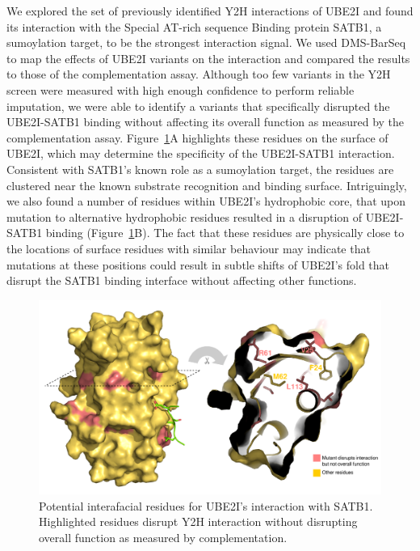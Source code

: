 We explored the set of previously identified Y2H interactions of UBE2I and found its interaction with the Special AT-rich sequence Binding protein SATB1, a sumoylation target, to be the strongest interaction signal. We used DMS-BarSeq to map the effects of UBE2I variants on the interaction and compared the results to those of the complementation assay. Although too few variants in the Y2H screen were measured with high enough confidence to perform reliable imputation, we were able to identify a  variants that specifically disrupted the UBE2I-SATB1 binding without affecting its overall function as measured by the complementation assay. Figure~\ref{fig:y2hVScompl}A highlights these residues on the surface of UBE2I, which may determine the specificity of the UBE2I-SATB1 interaction. Consistent with SATB1's known role as a sumoylation target, the residues are clustered near the known substrate recognition and binding surface. Intriguingly, we also found a number of residues within UBE2I's hydrophobic core, that upon mutation to alternative hydrophobic residues resulted in a disruption of UBE2I-SATB1 binding (Figure~\ref{fig:y2hVScompl}B). The fact that these residues are physically close to the locations of surface residues with similar behaviour may indicate that mutations at these positions could result in subtle shifts of UBE2I's fold that disrupt the SATB1 binding interface without affecting other functions.

\begin{figure}[h!]
	\centering
	\includegraphics[width=\textwidth]{img/satb1_interface.pdf}
	\caption{Potential interafacial residues for UBE2I's interaction with SATB1. Highlighted residues disrupt Y2H interaction without disrupting overall function as measured by complementation.}
	\label{fig:y2hVScompl}
\end{figure}


